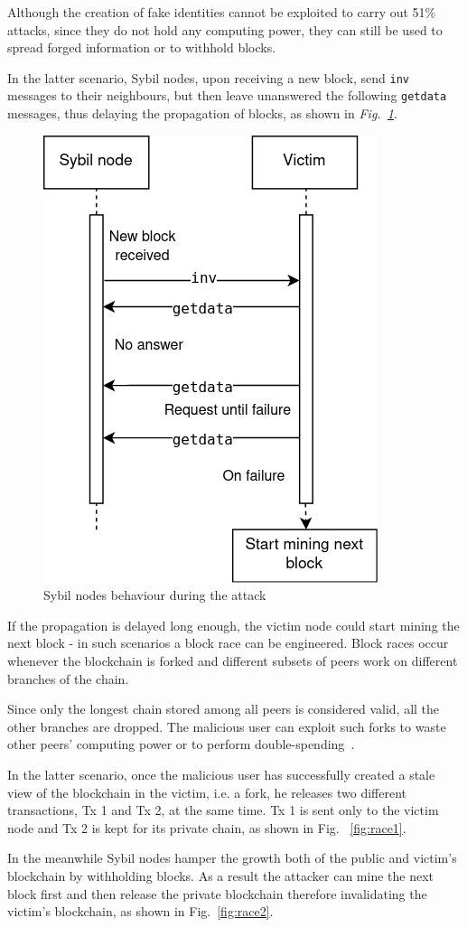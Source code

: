 \documentclass[12pt, letterpaper, twoside]{article}
\begin{document}
Although the creation of fake identities cannot be exploited to carry out 51\% attacks, since they do not hold any computing power, they can still be used to spread forged information or to withhold blocks.

In the latter scenario, Sybil nodes, upon receiving a new block, send \texttt{inv} messages to their neighbours, but then leave unanswered the following \texttt{getdata} messages, thus delaying the propagation of blocks, as shown in \emph{Fig.~\ref{fig:sybil}}.

\begin{figure}[h!]
	\includegraphics[width=.4\textwidth]{pict/sybil.png}
	\centering
	\caption{Sybil nodes behaviour during the attack}
	\label{fig:sybil}
\end{figure}

If the propagation is delayed long enough, the victim node could start mining the next block - in such scenarios a block race can be engineered. Block races occur whenever the blockchain is forked and different subsets of peers work on different branches of the chain.

Since only the longest chain stored among all peers is considered valid, all the other branches are dropped. The malicious user can exploit such forks to waste other peers' computing power or to perform double-spending~\cite{zhang-ds-sybil}. 

In the latter scenario, once the malicious user has successfully created a stale view of the blockchain in the victim, i.e. a fork, he releases two different transactions, Tx 1 and Tx 2, at the same time. Tx 1 is sent only to the victim node and Tx 2 is kept for its private chain, as shown in Fig. ~\ref{fig:race1}.

In the meanwhile Sybil nodes hamper the growth both of the public and victim's blockchain by withholding blocks. As a result the attacker can mine the next block first and then release the private blockchain therefore invalidating the victim's blockchain, as shown in Fig.~\ref{fig:race2}.
\end{document}
